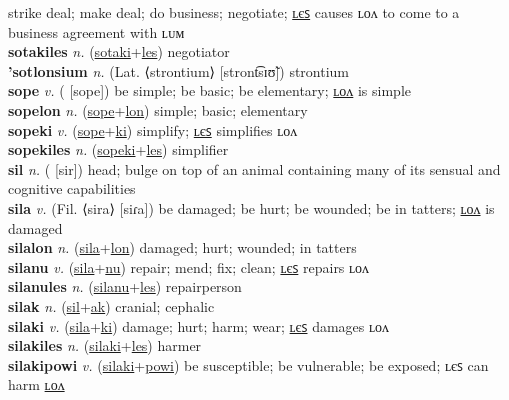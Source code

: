 strike deal; make deal; do business; negotiate; \hyperref[sotakiles]{ʟєꜱ} causes ʟᴏᴧ to come to a business agreement with ʟᴜᴍ \label{sotaki} \\
\textbf{sotakiles} \textit{n.} (\hyperref[sotaki]{sotaki}+\hyperref[les]{les})
negotiator \label{sotakiles} \\
\textbf{'sotlonsium} \textit{n.} (Lat. ⟨strontium⟩ [stront͡sɪʊ̃])
strontium \label{'sotlonsium} \\
\textbf{sope} \textit{v.} ( [sope])
be simple; be basic; be elementary; \hyperref[sopelon]{ʟᴏᴧ} is simple \label{sope} \\
\textbf{sopelon} \textit{n.} (\hyperref[sope]{sope}+\hyperref[lon]{lon})
simple; basic; elementary \label{sopelon} \\
\textbf{sopeki} \textit{v.} (\hyperref[sope]{sope}+\hyperref[ki]{ki})
simplify; \hyperref[sopekiles]{ʟєꜱ} simplifies ʟᴏᴧ \label{sopeki} \\
\textbf{sopekiles} \textit{n.} (\hyperref[sopeki]{sopeki}+\hyperref[les]{les})
simplifier \label{sopekiles} \\
\textbf{sil} \textit{n.} ( [sir])
head; bulge on top of an animal containing many of its sensual and cognitive capabilities \label{sil} \\
\textbf{sila} \textit{v.} (Fil. ⟨sira⟩ [siɾa])
be damaged; be hurt; be wounded; be in tatters; \hyperref[silalon]{ʟᴏᴧ} is damaged \label{sila} \\
\textbf{silalon} \textit{n.} (\hyperref[sila]{sila}+\hyperref[lon]{lon})
damaged; hurt; wounded; in tatters \label{silalon} \\
\textbf{silanu} \textit{v.} (\hyperref[sila]{sila}+\hyperref[nu]{nu})
repair; mend; fix; clean; \hyperref[silanules]{ʟєꜱ} repairs ʟᴏᴧ \label{silanu} \\
\textbf{silanules} \textit{n.} (\hyperref[silanu]{silanu}+\hyperref[les]{les})
repairperson \label{silanules} \\
\textbf{silak} \textit{n.} (\hyperref[sil]{sil}+\hyperref[ak]{ak})
cranial; cephalic \label{silak} \\
\textbf{silaki} \textit{v.} (\hyperref[sila]{sila}+\hyperref[ki]{ki})
damage; hurt; harm; wear; \hyperref[silakiles]{ʟєꜱ} damages ʟᴏᴧ \label{silaki} \\
\textbf{silakiles} \textit{n.} (\hyperref[silaki]{silaki}+\hyperref[les]{les})
harmer \label{silakiles} \\
\textbf{silakipowi} \textit{v.} (\hyperref[silaki]{silaki}+\hyperref[powi]{powi})
be susceptible; be vulnerable; be exposed; ʟєꜱ can harm \hyperref[silakipowilon]{ʟᴏᴧ} \label{silakipowi} \\
